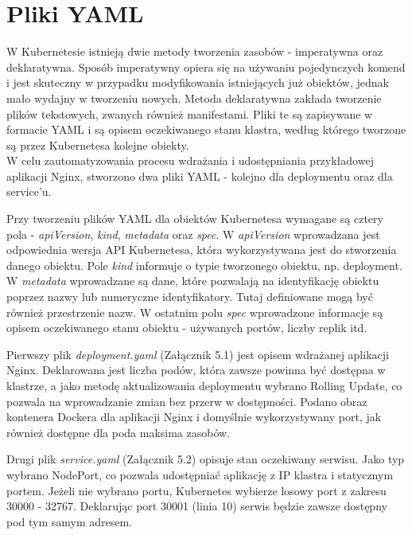\chapter{Pliki YAML}

W Kubernetesie istnieją dwie metody tworzenia zasobów - imperatywna oraz deklaratywna. Sposób imperatywny opiera się na używaniu pojedynczych komend i jest skuteczny w przypadku modyfikowania istniejących już obiektów, jednak mało wydajny w tworzeniu nowych. Metoda deklaratywna zakłada tworzenie plików tekstowych, zwanych również manifestami. Pliki te są zapisywane w formacie YAML i są opisem oczekiwanego stanu klastra, według którego tworzone są przez Kubernetesa kolejne obiekty. \\

W celu zautomatyzowania procesu wdrażania i udostępniania przykładowej aplikacji Nginx, stworzono dwa pliki YAML - kolejno dla deploymentu oraz dla service'u. 

Przy tworzeniu plików YAML dla obiektów Kubernetesa wymagane są cztery pola - \textit{apiVersion}, \textit{kind}, \textit{metadata} oraz \textit{spec}. W \textit{apiVersion} wprowadzana jest odpowiednia wersja API Kubernetesa, która wykorzystywana jest do stworzenia danego obiektu. Pole \textit{kind} informuje o typie tworzonego obiektu, np. deployment. W \textit{metadata} wprowadzane są dane, które pozwalają na identyfikację obiektu poprzez nazwy lub numeryczne identyfikatory. Tutaj definiowane mogą być również przestrzenie nazw. W ostatnim polu \textit{spec} wprowadzone informacje są opisem oczekiwanego stanu obiektu - używanych portów, liczby replik itd. 
\newpage

\vspace{1em}

Pierwszy plik \textit{deployment.yaml} (Załącznik 5.1) jest opisem wdrażanej aplikacji Nginx. Deklarowana jest liczba podów, która zawsze powinna być dostępna w klastrze, a jako metodę aktualizowania deploymentu wybrano Rolling Update, co pozwala na wprowadzanie zmian bez przerw w dostępności. Podano obraz kontenera Dockera dla aplikacji Nginx i domyślnie wykorzystywany port, jak również dostępne dla poda maksima zasobów.
\newpage

\vspace{1em}

Drugi plik \textit{service.yaml} (Załącznik 5.2) opisuje stan oczekiwany serwisu. Jako typ wybrano NodePort, co pozwala udostępniać aplikację z IP klastra i statycznym portem. Jeżeli nie wybrano portu, Kubernetes wybierze losowy port z zakresu 30000 - 32767. Deklarując port 30001 (linia 10) serwis będzie zawsze dostępny pod tym samym adresem.\\

